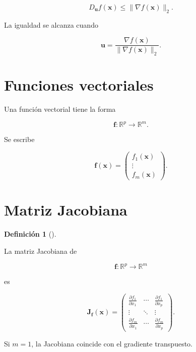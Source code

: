 \documentclass[
  spanish,
  10.5pt,
  letterpaper,
  DIV=11,
  numbers=noendperiod,
  oneside,
  open=any]{scrreprt}
\theoremstyle{definition}
\newtheorem{definition}{Definición}[chapter]
\theoremstyle{definition}
\theoremstyle{plain}
\theoremstyle{remark}
\begin{document}
\[
D_{\mathbf{u}}f(\mathbf{x})
\leq
\|\nabla f(\mathbf{x})\|_2.
\]

La igualdad se alcanza cuando

\[
\mathbf{u}
=
\frac{
\nabla f(\mathbf{x})
}{
\|\nabla f(\mathbf{x})\|_2
}.
\]

\section*{Funciones vectoriales}\label{funciones-vectoriales}


Una función vectorial tiene la forma

\[
\mathbf{f}:\mathbb{R}^{p}\to\mathbb{R}^{m}.
\]

Se escribe

\[
\mathbf{f}(\mathbf{x})
=
\begin{pmatrix}
f_1(\mathbf{x})\\
\vdots\\
f_m(\mathbf{x})
\end{pmatrix}.
\]

\section*{Matriz Jacobiana}\label{matriz-jacobiana}


\begin{definition}[]\protect\hypertarget{def-jacobiana}{}\label{def-jacobiana}

La matriz Jacobiana de

\[
\mathbf{f}:\mathbb{R}^{p}\to\mathbb{R}^{m}
\]

es

\[
\mathbf{J}_{\mathbf{f}}(\mathbf{x})
=
\begin{pmatrix}
\frac{\partial f_1}{\partial x_1}
&
\cdots
&
\frac{\partial f_1}{\partial x_p}
\\
\vdots
&
\ddots
&
\vdots
\\
\frac{\partial f_m}{\partial x_1}
&
\cdots
&
\frac{\partial f_m}{\partial x_p}
\end{pmatrix}.
\]

\end{definition}

Si \(m=1\), la Jacobiana coincide con el gradiente transpuesto.
\end{document}
